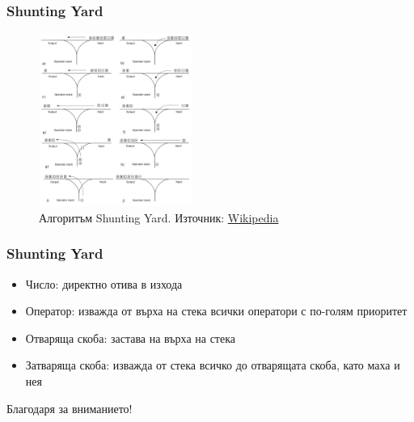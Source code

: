 \documentclass{beamer}
\begin{document}
\begin{frame}[fragile]
  \frametitle{Shunting Yard}
  \begin{figure}
    \centering
    \includegraphics[width=5cm]{images/shunting_yard}
    \caption{Алгоритъм Shunting Yard. Източник: \href{https://en.wikipedia.org/wiki/Shunting-yard_algorithm}{Wikipedia}}
    \label{fig:syard}
    \end{figure}  
\end{frame}
  

\begin{frame}[fragile]
  \frametitle{Shunting Yard}
  \begin{itemize}
    \item Число: директно отива в изхода
    \item Оператор: изважда от върха на стека всички оператори с по-голям приоритет
    \item Отваряща скоба: застава на върха на стека
    \item Затваряща скоба: изважда от стека всичко до отварящата скоба, като маха и нея
  \end{itemize}
\end{frame}


\begin{frame}
\centerline{Благодаря за вниманието!}
\end{frame}
\end{document}
